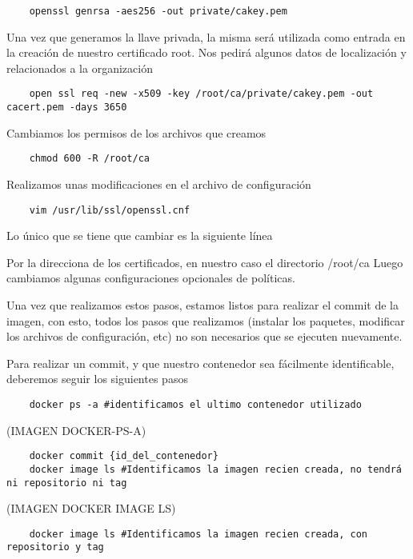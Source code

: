 \begin{verbatim}
    openssl genrsa -aes256 -out private/cakey.pem
\end{verbatim}

\noindent Una vez que generamos la llave privada, la misma será utilizada como entrada en la creación de 
nuestro certificado root. Nos pedirá algunos datos de localización y relacionados a la 
organización

\begin{verbatim}
    open ssl req -new -x509 -key /root/ca/private/cakey.pem -out cacert.pem -days 3650
\end{verbatim}

\noindent Cambiamos los permisos de los archivos que creamos
\begin{verbatim}
    chmod 600 -R /root/ca
\end{verbatim}

\noindent Realizamos unas modificaciones en el archivo de configuración
\begin{verbatim}
    vim /usr/lib/ssl/openssl.cnf
\end{verbatim}

 
Lo único que se tiene que cambiar es la siguiente línea 
 
Por la direcciona de los certificados, en nuestro caso el directorio /root/ca
Luego cambiamos algunas configuraciones opcionales de políticas.

Una vez que realizamos estos pasos, estamos listos para realizar el commit de la imagen, con esto,
todos los pasos que realizamos (instalar los paquetes, modificar los archivos de configuración, etc)
no son necesarios que se ejecuten nuevamente.

Para realizar un commit, y que nuestro contenedor sea fácilmente identificable, deberemos seguir 
los siguientes pasos

\begin{verbatim}
    docker ps -a #identificamos el ultimo contenedor utilizado
\end{verbatim}
 
(IMAGEN DOCKER-PS-A)

\begin{verbatim}
    docker commit {id_del_contenedor} 
    docker image ls #Identificamos la imagen recien creada, no tendrá ni repositorio ni tag
\end{verbatim}

(IMAGEN DOCKER IMAGE LS)

\begin{verbatim}
    docker image ls #Identificamos la imagen recien creada, con repositorio y tag
\end{verbatim}


